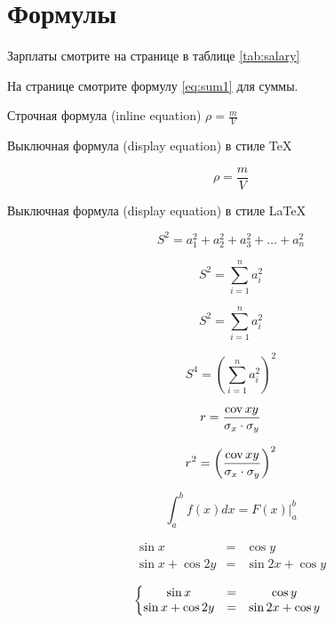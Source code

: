 

	\section{Формулы}
	
	
	Зарплаты смотрите на странице \pageref{tab:salary} в  таблице \ref{tab:salary}
	
	
	На странице \pageref{eq:sum1} смотрите формулу \ref{eq:sum1}  для   суммы.
	
	Строчная формула (inline equation) $ \rho=\frac{m}{V}$
	
	
	Выключная формула (display equation) в стиле \TeX 
	
	 $$ \rho=\frac{m}{V}$$
	 
	 
		Выключная формула (display equation) в стиле \LaTeX 
	
	\[ S^2 = a_1^2+ a_2^2+ a_3^2+\dots+a_n^2\] 
	
	\begin{equation}
		S^2=\sum_{i=1}^{n} a_i^2  \label{eq:sum1}
	\end{equation}
	
	
	\begin{equation*}
	S^2=\sum_{i=1}^{n} a_i^2
	\end{equation*}
	
	
    \begin{equation*}
    S^4=\left(\sum_{i=1}^{n} a_i^2\right)^2
    \end{equation*}
    	
    	
    	\begin{equation}
    		r=\frac{\operatorname{cov} x y}{\sigma_x\cdot \sigma_y}
    	\end{equation}
    	
  
  \begin{equation}
  r^2=\left(\frac{\operatorname{cov} x y}{\sigma_x\cdot \sigma_y}\right)^2
  \end{equation}
  
  
  \begin{equation}
     \int_{a}^b f(x) dx  = \left.F(x)\right|_a^b
  \end{equation}
    	
    	
  \begin{eqnarray}
  	\sin x &=& \cos y \\
  	\sin x + \cos 2y& =&\sin 2x +\cos y	
  \end{eqnarray}  	
 
 
\begin{equation}
 \left\{\begin{array}{@{}ccc}
\sin x &=& \cos y \\
\sin x + \cos 2y& =&\sin 2x +\cos y	
\end{array} \right. 	
\end{equation} 
 